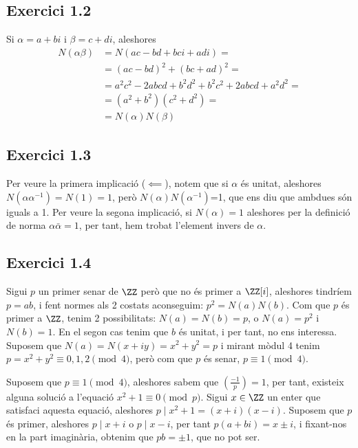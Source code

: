 \documentclass[11pt, a4paper]{article}
\begin{document}
    \subsection{Exercici 1.2}
    Si $\alpha=a+bi$ i $\beta=c+di$, aleshores 
    \begin{align*}
        N(\alpha\beta)&=N(ac-bd+bci+adi)=\\
        &=(ac-bd)^2+(bc+ad)^2=\\
        &=a^2c^2-2abcd+b^2d^2+b^2c^2+2abcd+a^2d^2=\\
        &=(a^2+b^2)(c^2+d^2)=\\
        &=N(\alpha)N(\beta)
    \end{align*}
    \subsection{Exercici 1.3}
    Per veure la primera implicació ($\impliedby$), notem que si $\alpha$ és unitat, aleshores $N(\alpha\alpha^{-1})=N(1)=1$, però $N(\alpha)N(\alpha^{-1})$=1, que ens diu que ambdues són iguals a 1.
    Per veure la segona implicació, si $N(\alpha)=1$ aleshores per la definició de norma $\alpha\bar{\alpha}=1$, per tant, hem trobat l'element invers de $\alpha$.
    \subsection{Exercici 1.4}
    Sigui $p$ un primer senar de $\ZZ$ però que no és primer a $\ZZ[i]$, aleshores tindríem $p=ab$, i fent normes als 2 costats aconseguim: $p^2=N(a)N(b)$. Com que $p$ és primer a $\ZZ$, tenim 2 possibilitats: $N(a)=N(b)=p$, o $N(a)=p^2$ i $N(b)=1$. En el segon cas tenim que $b$ és unitat, i per tant, no ens interessa. Suposem que $N(a)=N(x+iy)=x^2+y^2=p$ i mirant mòdul 4 tenim $p=x^2+y^2\equiv 0,1,2\pmod4$, però com que $p$ és senar, $p\equiv1\pmod4$.\par

    Suposem que $p\equiv1\pmod4$, aleshores sabem que $\left(\frac{-1}{p}\right)=1$, per tant, existeix alguna solució a l'equació $x^2+1\equiv0\pmod p$. Sigui $x\in\ZZ$ un enter que satisfaci aquesta equació, aleshores $p\mid x^2+1=(x+i)(x-i)$. Suposem que $p$ és primer, aleshores $p\mid x+i$ o $p\mid x-i$, per tant $p(a+bi)=x\pm i$, i fixant-nos en la part imaginària, obtenim que $pb=\pm1$, que no pot ser.
\end{document}
